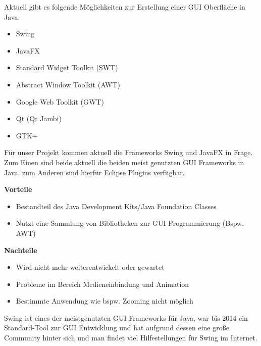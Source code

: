 Aktuell gibt es folgende Möglichkeiten zur Erstellung einer GUI Oberfläche in Java:
 \begin{itemize}
	\item Swing
	\item JavaFX
	\item Standard Widget Toolkit (SWT)
	\item Abstract Window Toolkit (AWT)
	\item Google Web Toolkit (GWT)
	\item Qt (Qt Jambi)
	\item GTK+
\end{itemize}
\nsecend %

Für unser Projekt kommen aktuell die Frameworks Swing und JavaFX in Frage. Zum Einen sind beide aktuell die beiden meist genutzten GUI Frameworks in Java, zum Anderen sind hierfür Eclipse Plugins verfügbar.
\nsecend %



\textbf{Vorteile}
\begin{itemize}
	\item Bestandteil des Java Development Kits/Java Foundation Classes
	\item Nutzt eine Sammlung von Bibliotheken zur GUI-Programmierung (Bspw. AWT)
\end{itemize}


\textbf{Nachteile}
\begin{itemize}
	\item Wird nicht mehr weiterentwickelt oder gewartet
	\item Probleme im Bereich Medieneinbindung und Animation
	\item Bestimmte Anwendung wie bspw. Zooming nicht möglich
\end{itemize}

Swing ist eines der meistgenutzten GUI-Frameworks für Java, war bis 2014 ein Standard-Tool zur GUI Entwicklung und hat aufgrund dessen eine große Community hinter sich und man findet viel Hilfestellungen für Swing im Internet.

\nsecend %

